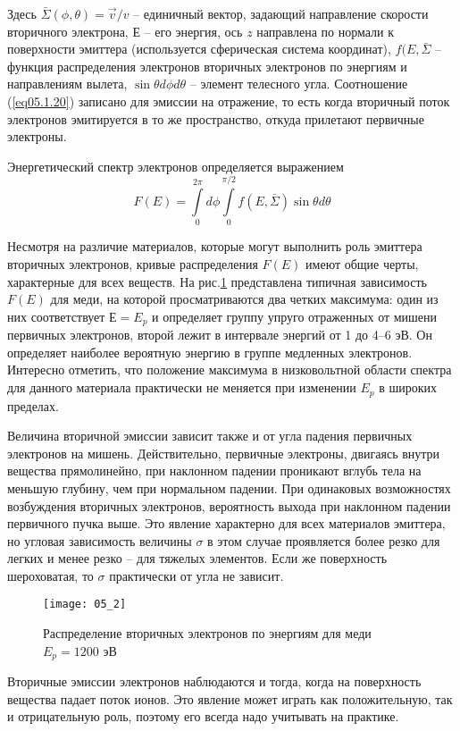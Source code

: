 Здесь \( \bar{\Sigma}(\phi,\theta) = \vec{v}/v \) -- единичный вектор, 
задающий направление скорости вторичного электрона, \( Е \) -- его энергия, 
ось \( z \)  направлена по нормали к поверхности эмиттера (используется 
сферическая система координат), \( f(E,\bar{\Sigma} \) -- функция 
распределения электронов вторичных электронов по энергиям и направлениям 
вылета, \( \sin\theta d\phi d\theta \) -- элемент телесного угла. Соотношение 
(\ref{eq05.1.20}) записано для эмиссии на отражение, то есть когда вторичный 
поток электронов эмитируется в то же пространство, откуда прилетают первичные 
электроны.

Энергетический спектр электронов определяется выражением
\begin{equation}
    F(E) = \int\limits_{0}^{2\pi} d\phi 
        \int\limits_{0}^{\pi/2} f(E,\bar{\Sigma}) \sin\theta d\theta
    \label{eq05.1.21}
\end{equation}

Несмотря на различие материалов, которые могут выполнить роль эмиттера 
вторичных электронов, кривые распределения \( F(E) \) имеют общие черты, 
характерные для всех веществ. На рис.\ref{img05.2} представлена типичная 
зависимость \( F(E) \) для меди, на которой просматриваются два четких 
максимума: один из них соответствует \( Е = E_p \) и определяет группу упруго 
отраженных от мишени первичных электронов, второй лежит в интервале энергий от 
1 до 4–6 эВ. Он определяет наиболее вероятную энергию в группе медленных 
электронов. Интересно отметить, что положение максимума в низковольтной 
области спектра  для  данного  материала практически не меняется при изменении 
\( E_p \) в широких пределах.

Величина вторичной эмиссии зависит также и от угла падения первичных 
электронов на мишень. Действительно, первичные электроны, двигаясь внутри 
вещества прямолинейно, при наклонном падении проникают вглубь тела на меньшую 
глубину, чем при нормальном падении. При одинаковых возможностях возбуждения 
вторичных электронов, вероятность выхода при наклонном падении первичного 
пучка выше. Это явление характерно для всех материалов эмиттера, но угловая 
зависимость величины \( \sigma \) в этом случае проявляется более резко для 
легких и менее резко -- для тяжелых элементов. Если же поверхность 
шероховатая, то \( \sigma \) практически от угла не зависит.
\begin{figure}[h]
    \center
    \texttt{[image: 05\_2]}
    \caption{Распределение вторичных электронов по энергиям для меди 
        \( E_p = 1200 \) эВ}
    \label{img05.2}
\end{figure}

Вторичные эмиссии электронов наблюдаются и тогда, когда на поверхность 
вещества падает поток ионов. Это явление может играть как положительную, так 
и отрицательную роль, поэтому его всегда надо учитывать на практике.
